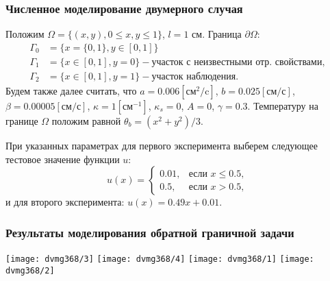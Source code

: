 \begin{frame}
    \frametitle{Численное моделирование двумерного случая}
    Положим $\Omega = \{(x,y), 0 \leq x,y \leq 1\}$, $l = 1$ см.
    Граница $\partial\Omega$:
    \[
        \begin{aligned}
            \Gamma_0 & = \{x=\{0,1\}, y \in [0,1]\} \\
            \Gamma_1 & = \{x\in [0,1], y=0\}
            - \text{участок с неизвестными отр. свойствами}, \\
            \Gamma_2 & = \{x \in [0,1], y=1\} - \text{участок наблюдения}.
        \end{aligned}
    \]
    Будем также далее считать, что $a = 0.006[\text{см}^2/\text{c}]$,
    $b=0.025[\text{см}/\text{с}]$, $\beta = 0.00005[\text{см}/\text{с}]$,
    $\kappa=1[\text{см}^{-1}]$, $\kappa_s = 0$, $A = 0$, $\gamma = 0.3$.
    Температуру на границе $\Omega$ положим равной $\theta_b = (x^2+y^2)/3$.

    При указанных параметрах для первого эксперимента выберем следующее тестовое
    значение функции $u$:
    \begin{equation*}
        u(x)=
        \begin{cases}
            0.01, & \text{если } x \le 0.5, \\
            0.5, & \text{если } x > 0.5,
        \end{cases}
    \end{equation*}
    и для второго эксперимента:
    $u(x)=0.49x+0.01$.
\end{frame}


\begin{frame}
    \frametitle{Результаты моделирования обратной граничной задачи}
    \centering
    \texttt{[image: dvmg368/3]}
    \texttt{[image: dvmg368/4]}
    \texttt{[image: dvmg368/1]}
    \texttt{[image: dvmg368/2]}
\end{frame}

